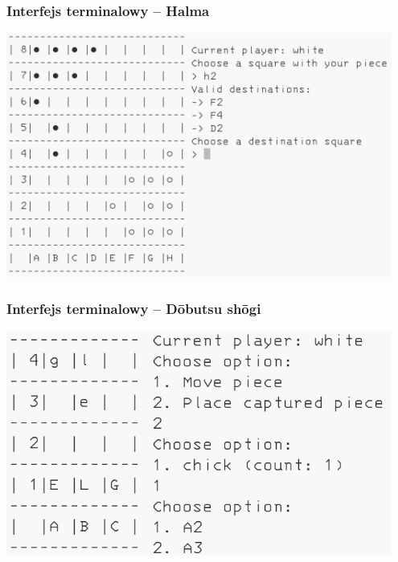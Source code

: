 \documentclass{beamer}
\begin{document}
\begin{frame}
	\frametitle{Interfejs terminalowy -- Halma}
	\centering
	\includegraphics[width=0.95\textwidth]{halma-terminal.png}
\end{frame}

\begin{frame}
	\frametitle{Interfejs terminalowy -- Dōbutsu shōgi}
	\centering
	\includegraphics[width=0.95\textwidth]{dobutsu-shogi-terminal.png}
\end{frame}
\end{document}
